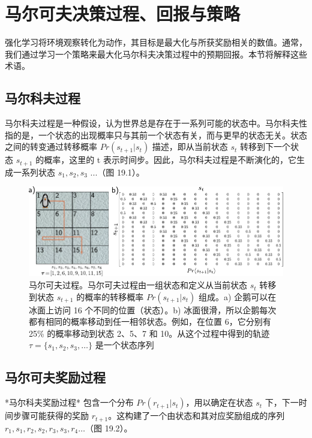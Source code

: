 \documentclass[lang=cn,newtx,10pt,scheme=chinese]{elegantbook}
\begin{document}
\section{马尔可夫决策过程、回报与策略}
强化学习将环境观察转化为动作，其目标是最大化与所获奖励相关的数值。通常，我们通过学习一个策略来最大化马尔科夫决策过程中的预期回报。本节将解释这些术语。

\subsection{马尔科夫过程}
马尔科夫过程是一种假设，认为世界总是存在于一系列可能的状态中。马尔科夫性指的是，一个状态的出现概率只与其前一个状态有关，而与更早的状态无关。状态之间的转变通过转移概率 \(Pr(s_{t+1}|s_t)\) 描述，即从当前状态 \(s_t\) 转移到下一个状态 \(s_{t+1}\) 的概率，这里的 t 表示时间步。因此，马尔科夫过程是不断演化的，它生成一系列状态 \(s_1, s_2, s_3\) ...（图 19.1）。

\begin{figure}[ht!]
\centering
\includegraphics[width=0.7\linewidth]{PDFFigures/UDLChap19PDF/ReinforceMDP.pdf}
\caption{马尔可夫过程。马尔可夫过程由一组状态和定义从当前状态 \(s_t\) 转移到状态 \(s_{t+1}\) 的概率的转移概率 \(Pr(s_{t+1}|s_t)\) 组成。a) 企鹅可以在冰面上访问 16 个不同的位置（状态）。b) 冰面很滑，所以企鹅每次都有相同的概率移动到任一相邻状态。例如，在位置 6，它分别有 25\% 的概率移动到状态 2、5、7 和 10。从这个过程中得到的轨迹 \(\tau = \{s_1, s_2, s_3, \ldots\}\) 是一个状态序列}
\end{figure}

\subsection{马尔可夫奖励过程}
*马尔科夫奖励过程* 包含一个分布 \(Pr(r_{t+1}|s_t)\)，用以确定在状态 \(s_t\) 下，下一时间步骤可能获得的奖励 \(r_{t+1}\)。这构建了一个由状态和其对应奖励组成的序列 \(r_1, s_1, r_2, s_2, r_3, s_3, r_4 \ldots\)（图 19.2）。
\end{document}
